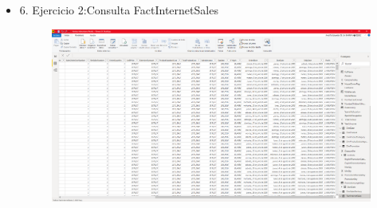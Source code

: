 \begin{itemize}
	\item 6. Ejercicio 2:Consulta FactInternetSales
		\begin{figure}[H]
		\begin{center}
		\includegraphics[width=18cm]{./Imagenes/imagen6}
		\end{center}
		\end{figure}
     




\end{itemize}
		